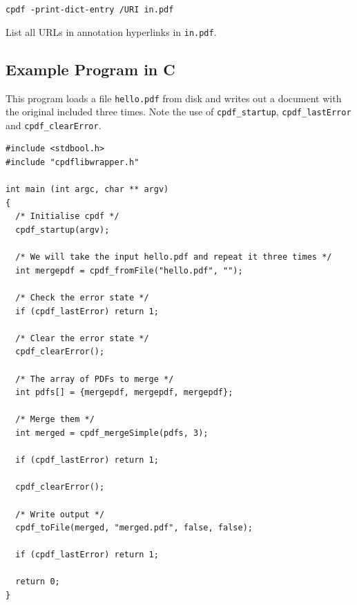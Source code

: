 \documentclass{book}
\begin{document}
\begin{framed}\noindent\texttt{cpdf -print-dict-entry /URI in.pdf}\end{framed}

\noindent List all URLs in annotation hyperlinks in \texttt{in.pdf}.

\pagestyle{empty}\thispagestyle{plain}
\cleardoublepage

\begin{cpdflib}
\chapter*{Example Program in C}

This program loads a file \texttt{hello.pdf} from disk and writes out a document with the original included three times. Note the use of \texttt{cpdf\_startup}, \texttt{cpdf\_lastError} and \texttt{cpdf\_clearError}.

\begin{small}
\begin{verbatim}
#include <stdbool.h>
#include "cpdflibwrapper.h"

int main (int argc, char ** argv)
{
  /* Initialise cpdf */
  cpdf_startup(argv);

  /* We will take the input hello.pdf and repeat it three times */
  int mergepdf = cpdf_fromFile("hello.pdf", "");

  /* Check the error state */
  if (cpdf_lastError) return 1;

  /* Clear the error state */
  cpdf_clearError();

  /* The array of PDFs to merge */
  int pdfs[] = {mergepdf, mergepdf, mergepdf};

  /* Merge them */
  int merged = cpdf_mergeSimple(pdfs, 3);
  
  if (cpdf_lastError) return 1;

  cpdf_clearError();

  /* Write output */
  cpdf_toFile(merged, "merged.pdf", false, false);

  if (cpdf_lastError) return 1;

  return 0;
}
\end{verbatim}
\end{small}
\end{cpdflib}
\end{document}
